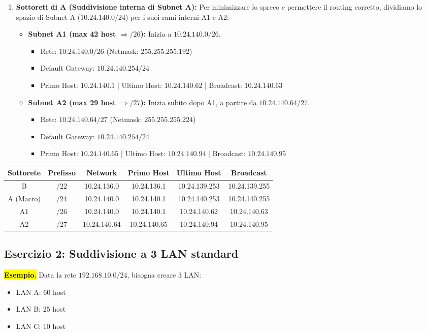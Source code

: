 \documentclass[11pt,a4paper]{report}
\begin{document}
\begin{enumerate}
  \item \textbf{Sottoreti di A (Suddivisione interna di Subnet A):} 
  Per minimizzare lo spreco e permettere il routing corretto, dividiamo lo spazio di Subnet A ($10.24.140.0/24$) per i suoi rami interni A1 e A2:
  \begin{itemize}
    \item \textbf{Subnet A1 (max 42 host $\Rightarrow /26$):} Inizia a $10.24.140.0/26$.
    \begin{itemize}
      \item Rete: $10.24.140.0/26$ (Netmask: $255.255.255.192$)
      \item Default Gateway: $10.24.140.254/24$
      \item Primo Host: $10.24.140.1$ | Ultimo Host: $10.24.140.62$ | Broadcast: $10.24.140.63$
    \end{itemize}
    \item \textbf{Subnet A2 (max 29 host $\Rightarrow /27$):} Inizia subito dopo A1, a partire da $10.24.140.64/27$.
    \begin{itemize}
      \item Rete: $10.24.140.64/27$ (Netmask: $255.255.255.224$)
      \item Default Gateway: $10.24.140.254/24$
      \item Primo Host: $10.24.140.65$ | Ultimo Host: $10.24.140.94$ | Broadcast: $10.24.140.95$
    \end{itemize}
  \end{itemize}
\end{enumerate}

\begin{center}
\small
\begin{tabular}{|c|c|c|c|c|c|}
\hline
Sottorete & Prefisso & Network & Primo Host & Ultimo Host & Broadcast \\
\hline
B & /22 & 10.24.136.0 & 10.24.136.1 & 10.24.139.253 & 10.24.139.255 \\
\hline
A (Macro) & /24 & 10.24.140.0 & 10.24.140.1 & 10.24.140.253 & 10.24.140.255 \\
\hline
A1 & /26 & 10.24.140.0 & 10.24.140.1 & 10.24.140.62 & 10.24.140.63 \\
\hline
A2 & /27 & 10.24.140.64 & 10.24.140.65 & 10.24.140.94 & 10.24.140.95 \\
\hline
\end{tabular}
\end{center}

\subsection{Esercizio 2: Suddivisione a 3 LAN standard}
\hl{\textbf{Esempio.}} Data la rete $192.168.10.0/24$, bisogna creare 3 LAN:
\begin{itemize}
  \item LAN A: 60 host
  \item LAN B: 25 host
  \item LAN C: 10 host
\end{itemize}
\end{document}
